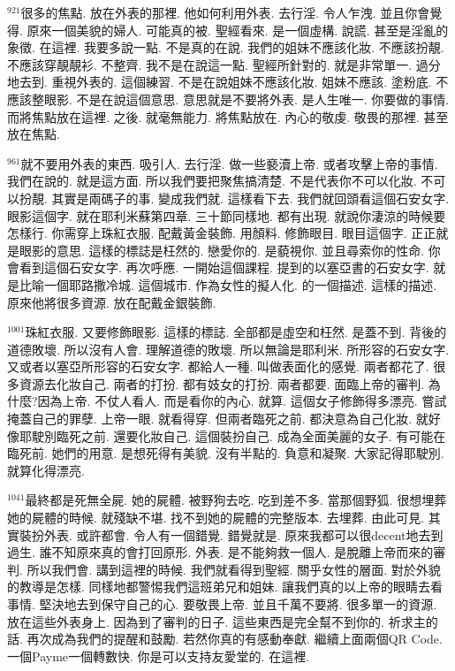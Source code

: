 \documentclass{book}
\begin{document}
$^{921}$很多的焦點.
放在外表的那裡.
他如何利用外表.
去行淫.
令人乍洩.
並且你會覺得.
原來一個美貌的婦人.
可能真的被.
聖經看來.
是一個虛構.
說謊.
甚至是淫亂的象徵.
在這裡.
我要多說一點.
不是真的在說.
我們的姐妹不應該化妝.
不應該扮靚.
不應該穿靚靚衫.
不整齊.
我不是在說這一點.
聖經所針對的.
就是非常單一.
過分地去到.
重視外表的.
這個練習.
不是在說姐妹不應該化妝.
姐妹不應該.
塗粉底.
不應該整眼影.
不是在說這個意思.
意思就是不要將外表.
是人生唯一.
你要做的事情.
而將焦點放在這裡.
之後.
就毫無能力.
將焦點放在.
內心的敬虔.
敬畏的那裡.
甚至放在焦點.

$^{961}$就不要用外表的東西.
吸引人.
去行淫.
做一些褻瀆上帝.
或者攻擊上帝的事情.
我們在說的.
就是這方面.
所以我們要把聚焦搞清楚.
不是代表你不可以化妝.
不可以扮靚.
其實是兩碼子的事.
變成我們就.
這樣看下去.
我們就回頭看這個石安女字.
眼影這個字.
就在耶利米蘇第四章.
三十節同樣地.
都有出現.
就說你淒涼的時候要怎樣行.
你需穿上珠紅衣服.
配戴黃金裝飾.
用顏料.
修飾眼目.
眼目這個字.
正正就是眼影的意思.
這樣的標誌是枉然的.
戀愛你的.
是藐視你.
並且尋索你的性命.
你會看到這個石安女字.
再次呼應.
一開始這個課程.
提到的以塞亞書的石安女字.
就是比喻一個耶路撒冷城.
這個城市.
作為女性的擬人化.
的一個描述.
這樣的描述.
原來他將很多資源.
放在配戴金銀裝飾.

$^{1001}$珠紅衣服.
又要修飾眼影.
這樣的標誌.
全部都是虛空和枉然.
是蓋不到.
背後的道德敗壞.
所以沒有人會.
理解道德的敗壞.
所以無論是耶利米.
所形容的石安女字.
又或者以塞亞所形容的石安女字.
都給人一種.
叫做表面化的感覺.
兩者都花了.
很多資源去化妝自己.
兩者的打扮.
都有妓女的打扮.
兩者都要.
面臨上帝的審判.
為什麼?因為上帝.
不仗人看人.
而是看你的內心.
就算.
這個女子修飾得多漂亮.
嘗試掩蓋自己的罪孽.
上帝一眼.
就看得穿.
但兩者臨死之前.
都決意為自己化妝.
就好像耶駛別臨死之前.
還要化妝自己.
這個裝扮自己.
成為全面美麗的女子.
有可能在臨死前.
她們的用意.
是想死得有美貌.
沒有半點的.
負意和凝聚.
大家記得耶駛別.
就算化得漂亮.

$^{1041}$最終都是死無全屍.
她的屍體.
被野狗去吃.
吃到差不多.
當那個野狐.
很想埋葬她的屍體的時候.
就殘缺不堪.
找不到她的屍體的完整版本.
去埋葬.
由此可見.
其實裝扮外表.
或許都會.
令人有一個錯覺.
錯覺就是.
原來我都可以很decent地去到過生.
誰不知原來真的會打回原形.
外表.
是不能夠救一個人.
是脫離上帝而來的審判.
所以我們會.
講到這裡的時候.
我們就看得到聖經.
關乎女性的層面.
對於外貌的教導是怎樣.
同樣地都警惕我們這班弟兄和姐妹.
讓我們真的以上帝的眼睛去看事情.
堅決地去到保守自己的心.
要敬畏上帝.
並且千萬不要將.
很多單一的資源.
放在這些外表身上.
因為到了審判的日子.
這些東西是完全幫不到你的.
祈求主的話.
再次成為我們的提醒和鼓勵.
若然你真的有感動奉獻.
繼續上面兩個QR Code.
一個Payme一個轉數快.
你是可以支持友愛堂的.
在這裡.
\end{document}
